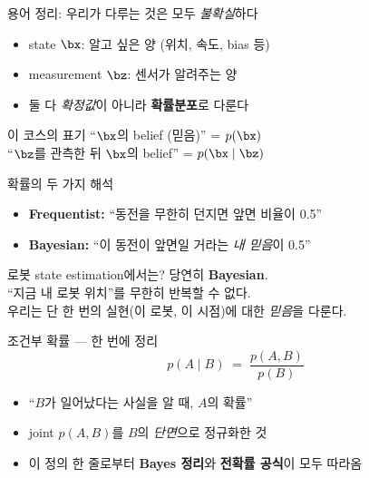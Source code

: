 \begin{frame}{용어 정리: 우리가 다루는 것은 모두 \emph{불확실}하다}
  \begin{itemize}
    \item state $\bx$: 알고 싶은 양 (위치, 속도, bias 등)
    \item measurement $\bz$: 센서가 알려주는 양
    \item 둘 다 \emph{확정값}이 아니라 \textbf{확률분포}로 다룬다
  \end{itemize}
  \vspace{0.5em}
  \pause
  \begin{block}{이 코스의 표기}
    ``$\bx$의 belief (믿음)'' = $p(\bx)$ \\
    ``$\bz$를 관측한 뒤 $\bx$의 belief'' = $p(\bx \mid \bz)$
  \end{block}
\end{frame}

\begin{frame}{확률의 두 가지 해석}
  \footnotesize
  \begin{itemize}
    \item \textbf{Frequentist:} ``동전을 무한히 던지면 앞면 비율이 0.5''
    \item \textbf{Bayesian:} ``이 동전이 앞면일 거라는 \emph{내 믿음}이 0.5''
  \end{itemize}
  \pause
  \vspace{0.4em}
  \begin{block}{로봇 state estimation에서는?}
    당연히 \textbf{Bayesian}. \\
    ``지금 내 로봇 위치''를 무한히 반복할 수 없다. \\
    우리는 단 한 번의 실현(이 로봇, 이 시점)에 대한 \emph{믿음}을 다룬다.
  \end{block}
\end{frame}

\begin{frame}{조건부 확률 — 한 번에 정리}
  \[
    p(A \mid B) \;=\; \frac{p(A, B)}{p(B)}
  \]
  \begin{itemize}
    \item ``$B$가 일어났다는 사실을 알 때, $A$의 확률''
    \item joint $p(A,B)$를 $B$의 \emph{단면}으로 정규화한 것
    \item 이 정의 한 줄로부터 \textbf{Bayes 정리}와 \textbf{전확률 공식}이 모두 따라옴
  \end{itemize}
\end{frame}

